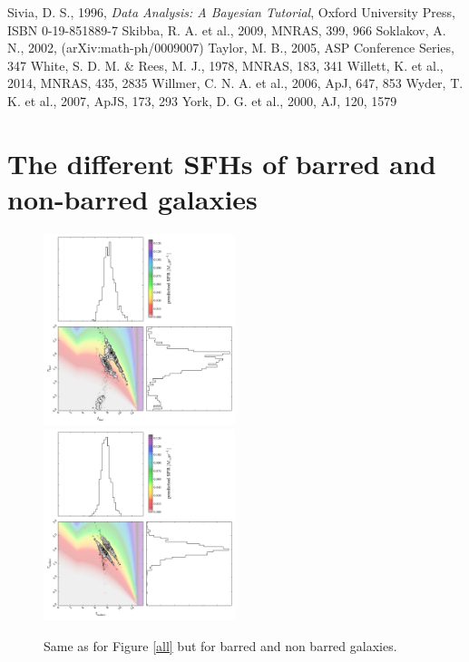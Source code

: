 \documentclass{mn2e}
\begin{document}
\begin{thebibliography}{}
 Sivia, D. S., 1996, \emph{Data Analysis: A Bayesian Tutorial}, Oxford University Press, ISBN 0-19-851889-7
 Skibba, R. A. et al., 2009, MNRAS, 399, 966
 Soklakov, A. N., 2002, (arXiv:math-ph/0009007)
 Taylor, M. B., 2005, ASP Conference Series, 347
 White, S. D. M. \& Rees, M. J., 1978, MNRAS, 183, 341
 Willett, K. et al., 2014, MNRAS, 435, 2835
 Willmer, C. N. A. et al., 2006, ApJ, 647, 853
 Wyder, T. K. et al., 2007, ApJS, 173, 293
 York, D. G. et al., 2000, AJ, 120, 1579
\end{thebibliography}{}


\appendix
\section{The different SFHs of barred and non-barred galaxies}

\begin{figure}
\includegraphics[width=0.4975\textwidth]{bars.pdf}
\includegraphics[width=0.4975\textwidth]{no_bars.pdf}
\caption{Same as for Figure \ref{all} but for barred and non barred galaxies.}
\label{bars}
\end{figure}
\end{document}
